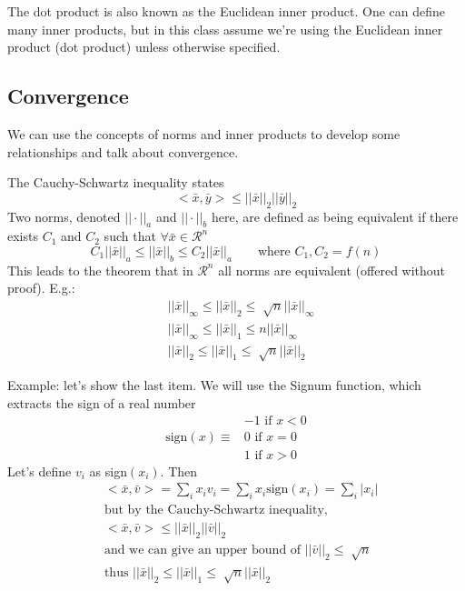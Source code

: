 \documentclass[12pt]{article}
\begin{document}
The dot product is also known as the Euclidean inner product. One can define many inner products, but in this class assume we're using the Euclidean inner product (dot product) unless otherwise specified. 

\subsection{Convergence}
We can use the concepts of norms and inner products to develop some relationships and talk about convergence. 

The Cauchy-Schwartz inequality states
%
\begin{equation}
< \bar{x}, \bar{y} > \leq ||\bar{x}||_2 ||\bar{y}||_2 \nonumber
\end{equation}
%
Two norms, denoted $|| \cdot ||_a$ and $|| \cdot ||_b$ here, are defined as being equivalent if there exists $C_1$ and $C_2$ such that $\forall \bar{x} \in \mathcal{R}^n$
%
\begin{equation}
C_1 ||\bar{x}||_a \leq ||\bar{x}||_b \leq C_2 ||\bar{x}||_a \qquad \text{where } C_1, C_2 = f(n) \nonumber
\end{equation}
%
This leads to the theorem that in $\mathcal{R}^n$ all norms are equivalent (offered without proof). E.g.:
\begin{align}
& ||\bar{x}||_{\infty} \leq ||\bar{x}||_2 \leq \sqrt[]{n} ||\bar{x}||_{\infty} \nonumber \\
%
& ||\bar{x}||_{\infty} \leq ||\bar{x}||_1 \leq n ||\bar{x}||_{\infty} \nonumber \\
%
& ||\bar{x}||_2 \leq ||\bar{x}||_1 \leq \sqrt[]{n} ||\bar{x}||_2 \nonumber
\end{align}

Example: let's show the last item. We will use the Signum function, which extracts the sign of a real number
\begin{align}
              & -1 \text{ if } x < 0 \nonumber \\
\text{sign}(x) \equiv &  0 \text{ if } x = 0 \nonumber \\
              &  1 \text{ if } x > 0 \nonumber
\end{align}
%
Let's define $v_i$ as sign$(x_i)$. Then
%
\begin{align}
&< \bar{x}, \bar{v} > = \sum_i x_i v_i = \sum_i x_i \text{sign}(x_i) = \sum_i |x_i| \nonumber \\
%
&\text{but by the Cauchy-Schwartz inequality,}\nonumber \\
%
&< \bar{x}, \bar{v} > \leq ||\bar{x}||_2 ||\bar{v}||_2 \nonumber \\
%
&\text{and we can give an upper bound of } ||\bar{v}||_2 \leq \sqrt[]{n} \nonumber \\ 
%
&\text{thus } ||\bar{x}||_2 \leq ||\bar{x}||_1 \leq \sqrt[]{n} ||\bar{x}||_2 \nonumber
\end{align}
\end{document}
